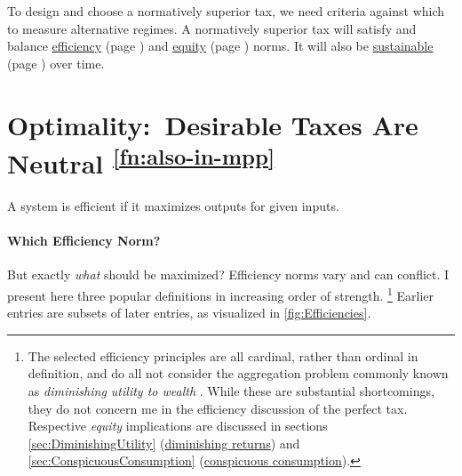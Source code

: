 



To design and choose a normatively superior tax, we need criteria against which to measure alternative regimes.
A normatively superior tax will satisfy and balance \hyperref[sec:Efficiency]{efficiency} (page \pageref{sec:Efficiency}) and \hyperref[sec:Equity]{equity} (page \pageref{sec:Equity}) norms.
It will also be \hyperref[sec:sustainability]{sustainable} (page \pageref{sec:Sustainability}) over time.

\section[Optimality]{Optimality:~Desirable Taxes Are Neutral \textsuperscript{\ref{fn:also-in-mpp}}}
	\label{sec:tax-optimality}
A system is efficient if it maximizes outputs for given inputs.


\paragraph{Which Efficiency Norm?}
But exactly \emph{what} should be maximized?
Efficiency norms vary and can conflict.
I present here three popular definitions in increasing order of strength.
\footnote{
	The selected efficiency principles are all cardinal, rather than ordinal in definition, and do all not consider the aggregation problem commonly known as \emph{diminishing utility to wealth} \citep{Hicks1946}.
	While these are substantial shortcomings, they do not concern me in the efficiency discussion of the perfect tax.
	Respective \emph{equity} implications are discussed in sections \ref{sec:DiminishingUtility} (\hyperref[sec:DiminishingUtility]{diminishing returns}) and \ref{sec:ConspicuousConsumption} (\hyperref[sec:ConspicuousConsumption]{conspicuous consumption}).
}
Earlier entries are subsets of later entries, as visualized in \autoref{fig:Efficiencies}.

